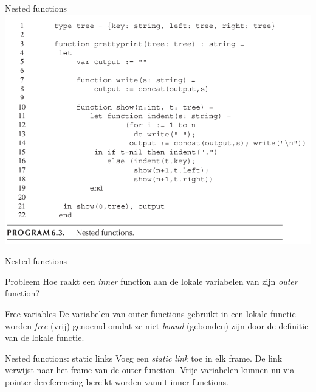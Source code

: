\documentclass{beamer}
\begin{document}
\begin{frame}{Nested functions}
	\includegraphics[width=\textwidth]{nested_functions.png}
\end{frame}

\begin{frame}{Nested functions}
	\begin{alertblock}{Probleem}
		Hoe raakt een \emph{inner} function aan de lokale variabelen van zijn \emph{outer} function?
	\end{alertblock}
	\begin{block}{Free variables}
		De variabelen van outer functions gebruikt in een lokale functie worden \emph{free} (vrij) genoemd omdat ze niet \emph{bound} (gebonden) zijn door de definitie van de lokale functie.
	\end{block}
\end{frame}

\begin{frame}{Nested functions: static links}
	Voeg een \emph{static link} toe in elk frame. De link verwijst naar het frame van de outer function. Vrije variabelen kunnen nu via pointer dereferencing bereikt worden vanuit inner functions.
\end{frame}
\end{document}
